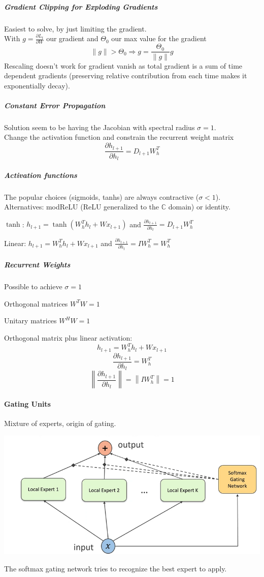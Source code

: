 \documentclass[10pt]{report}
\begin{document}
\subparagraph{Gradient Clipping for Exploding Gradients} Easiest to solve, by just limiting the gradient.\\
With $g=\frac{\partial L_t}{\partial W}$ our gradient and $\Theta_0$ our max value for the gradient
$$\|g\|>\Theta_0\Rightarrow g=\frac{\Theta_0}{\|g\|}g$$
Rescaling doesn't work for gradient vanish as total gradient is a sum of time dependent gradients (preserving relative contribution from each time makes it exponentially decay).
\subparagraph{Constant Error Propagation} Solution seem to be having the Jacobian with spectral radius $\sigma = 1$.\\
Change the activation function and constrain the recurrent weight matrix
$$\frac{\partial h_{l+1}}{\partial h_l}=D_{l+1}W_h^T$$
\subparagraph{Activation functions} The popular choices (sigmoids, tanhs) are always contractive ($\sigma < 1$). Alternatives: modReLU (ReLU generalized to the $\mathbb{C}$ domain) or identity.
\begin{list}{}{}
	\item $\tanh$: $h_{l+1}=\tanh(W_h^Th_l+Wx_{l+1})$ and $\frac{\displaystyle \partial h_{l+1}}{\displaystyle \partial h_l} = D_{l+1}W_h^T$
	\item Linear: $h_{l+1}=W_h^Th_l+Wx_{l+1}$ and $\frac{\displaystyle \partial h_{l+1}}{\displaystyle \partial h_l} = IW_h^T = W_h^T$
\end{list}
\subparagraph{Recurrent Weights} Possible to achieve $\sigma = 1$
\begin{list}{}{}
	\item Orthogonal matrices $W^TW = 1$
	\item Unitary matrices $W^H W = 1$
\end{list}
Orthogonal matrix plus linear activation:
$$h_{l+1}= W_h^Th_l+Wx_{l+1}$$
$$\frac{\partial h_{l+1}}{\partial h_l} = W_h^T$$
$$\left\|\frac{\partial h_{l+1}}{\partial h_l}\right\|=\left\|IW_h^T\right\|=1$$
\paragraph{Gating Units} Mixture of experts, origin of gating.
\begin{center}
	\includegraphics[scale=0.5]{93.png}
\end{center}
The softmax gating network tries to recognize the best expert to apply.
\end{document}
